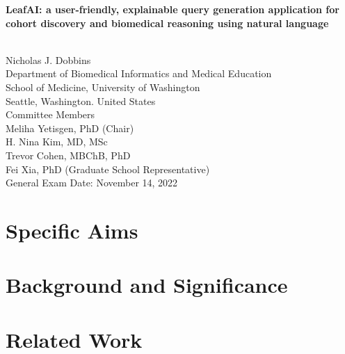 \documentclass[12pt]{article} %
\begin{document}
\begin{titlepage}
    \begin{center}
        \vspace*{1cm}
        \begin{huge}
            \textbf{LeafAI: a user-friendly, explainable query generation application for cohort discovery and biomedical reasoning using natural language}
        \end{huge} \\
        \vspace{0.7cm}
        Nicholas J. Dobbins \\
        Department of Biomedical Informatics and Medical Education \\
        School of Medicine, University of Washington \\
        Seattle, Washington. United States \\
        \vspace{0.7cm}
        Committee Members \\
        Meliha Yetisgen, PhD (Chair) \\
        H. Nina Kim, MD, MSc \\
        Trevor Cohen, MBChB, PhD \\
        Fei Xia, PhD (Graduate School Representative) \\
        \vspace{0.7cm}
        General Exam Date: November 14, 2022
    \end{center}
\end{titlepage}

\tableofcontents
\thispagestyle{empty}
\newpage
\addtocounter{page}{-1}
 
\section{Specific Aims}
\label{sec:specific_aims}

\newpage

\section{Background and Significance}
\label{sec:background}


\section{Related Work}
\label{sec:related_work}

\end{document}
